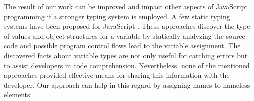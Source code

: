 \documentclass[10pt, preprint]{sigplanconf}
\begin{document}
The result of our work can be improved and impact other aspects of JavaScript programming if a stronger typing system is employed. A few static typing systems have been proposed for JavaScript \cite{Anderson, Anderson2, Heidegger, Thiemann}. These approaches discover the type of values and object structures for a variable by statically analyzing the source code and possible program control flows lead to the variable assignment. The discovered facts about variable types are not only useful for catching errors but to assist developers in code comprehension. Nevertheless, none of the mentioned approaches provided effective means for sharing this information with the developer. Our approach can help in this regard by assigning names to nameless elements.


\end{document}
